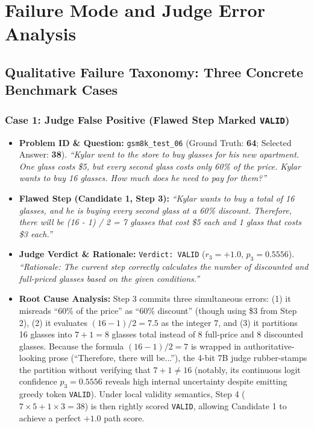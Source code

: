 \documentclass[10pt,a4paper]{article}
\begin{document}
\section{Failure Mode and Judge Error Analysis}

\subsection{Qualitative Failure Taxonomy: Three Concrete Benchmark Cases}

\subsubsection*{Case 1: Judge False Positive (Flawed Step Marked \texttt{VALID})}
\begin{itemize}
    \item \textbf{Problem ID \& Question:} \texttt{gsm8k\_test\_06} (Ground Truth: \textbf{64}; Selected Answer: \textbf{38}). \textit{``Kylar went to the store to buy glasses for his new apartment. One glass costs \$5, but every second glass costs only 60\% of the price. Kylar wants to buy 16 glasses. How much does he need to pay for them?''}
    \item \textbf{Flawed Step (Candidate 1, Step 3):} \textit{``Kylar wants to buy a total of 16 glasses, and he is buying every second glass at a 60\% discount. Therefore, there will be (16 - 1) / 2 = 7 glasses that cost \$5 each and 1 glass that costs \$3 each.''}
    \item \textbf{Judge Verdict \& Rationale:} \texttt{Verdict: VALID} ($r_3 = +1.0$, $p_3 = 0.5556$). \textit{``Rationale: The current step correctly calculates the number of discounted and full-priced glasses based on the given conditions.''}
    \item \textbf{Root Cause Analysis:} Step 3 commits three simultaneous errors: (1) it misreads ``60\% of the price'' as ``60\% discount'' (though using \$3 from Step 2), (2) it evaluates $(16-1)/2 = 7.5$ as the integer $7$, and (3) it partitions 16 glasses into $7 + 1 = 8$ glasses total instead of 8 full-price and 8 discounted glasses. Because the formula $(16-1)/2 = 7$ is wrapped in authoritative-looking prose (``Therefore, there will be...''), the 4-bit 7B judge rubber-stamps the partition without verifying that $7 + 1 \ne 16$ (notably, its continuous logit confidence $p_3 = 0.5556$ reveals high internal uncertainty despite emitting greedy token \texttt{VALID}). Under local validity semantics, Step 4 ($7 \times 5 + 1 \times 3 = 38$) is then rightly scored \texttt{VALID}, allowing Candidate 1 to achieve a perfect $+1.0$ path score.
\end{itemize}
\end{document}
